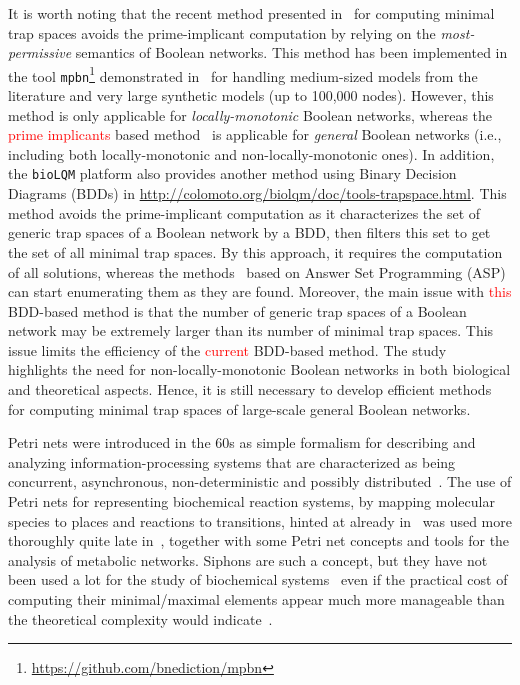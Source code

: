 \documentclass[preprint,12pt]{elsarticle}
\newcommand{\change}[1]{\textcolor{red}{#1}}
\begin{document}
It is worth noting that the recent method presented in~\cite{DBLP:conf/ictai/ChevalierFPZ19} for computing minimal trap spaces avoids the prime-implicant computation by relying on the \emph{most-permissive} semantics of Boolean networks.
This method has been implemented in the tool \texttt{mpbn}\footnote{\url{https://github.com/bnediction/mpbn}} demonstrated in~\cite{Paulev2020} for handling medium-sized models from the literature and very large synthetic models (up to 100,000 nodes).
However, this method is only applicable for \emph{locally-monotonic} Boolean networks, whereas the \change{prime implicants} based method~\cite{klarner2015computing} is applicable for \emph{general} Boolean networks (i.e., including both locally-mono\-tonic and non-locally-monotonic ones).
In addition, the \texttt{bioLQM} platform also provides another method using Binary Decision Diagrams (BDDs) in \url{http://colomoto.org/biolqm/doc/tools-trapspace.html}.
This method avoids the prime-implicant computation as it characterizes the set of generic trap spaces of a Boolean network by a BDD, then filters this set to get the set of all minimal trap spaces.
By this approach, it requires the computation of all solutions, whereas the methods~\cite{klarner2015computing,Paulev2020} based on Answer Set Programming (ASP) can start enumerating them as they are found.
Moreover, the main issue with \change{this} BDD-based method is that the number of generic trap spaces of a Boolean network may be extremely larger than its number of minimal trap spaces.
This issue limits the efficiency of the \change{current} BDD-based method.
The study~\cite{DBLP:journals/tcs/NoualRS13} highlights the need for non-locally-monotonic Boolean networks in both biological and theoretical aspects.
Hence, it is still necessary to develop efficient methods for computing minimal trap spaces of large-scale general Boolean networks.

Petri nets were introduced in the 60s as simple formalism for describing and analyzing information-processing systems that are characterized as being concurrent, asynchronous, non-deterministic and possibly distributed~\cite{peterson1981petri,Murata1989}.
The use of Petri nets for representing biochemical reaction systems, by mapping molecular species to places and reactions to transitions, hinted at already in~\cite{peterson1981petri,Murata1989} was used more thoroughly quite late in~\cite{reddy1993petri}, together with some Petri net concepts and tools for the analysis of metabolic networks.
Siphons are such a concept, but they have not been used a lot for the study of biochemical systems~\cite{zevedei2003topological,blatke2015biomodel} even if the practical cost of computing their minimal/maximal elements appear much more manageable than the theoretical complexity would indicate~\cite{oanea2010new,nabli2016enumerating}.
\end{document}
